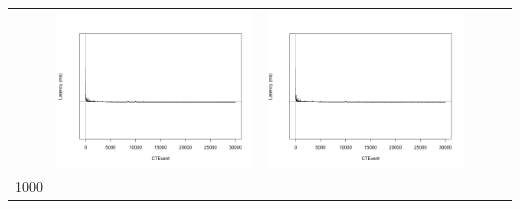 \begin{table}[htbp]
{\begin{tabular}{l | ccccc}
    			   & \begin{minipage}{.15\textwidth}\vspace{2pt}     							
     			 	\includegraphics[width=\linewidth]{images/lat-log-triple/N7}
    				 \end{minipage}
    			   &	 \begin{minipage}{.15\textwidth}\vspace{2pt}     							
     			 	\includegraphics[width=\linewidth]{images/lat-log-triple/N10}
    				 \end{minipage}\\	
		1000   &	 \begin{minipage}{.15\textwidth}\vspace{2pt}     							

\end{minipage}
\end{tabular}}
\end{table}
